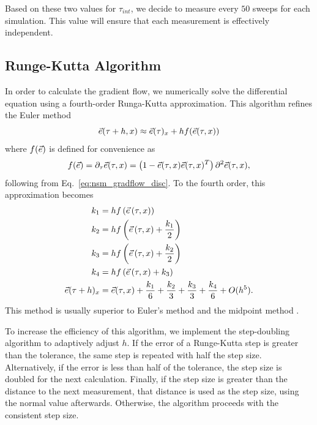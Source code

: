 Based on these two values for $\tau_{int}$, we decide to measure every $50$ sweeps for each simulation. This value will ensure that each measurement is effectively independent.

\subsection{Runge-Kutta Algorithm}
\label{sec:runga-kutta}
In order to calculate the gradient flow, we numerically solve the differential equation using a fourth-order Runga-Kutta approximation. This algorithm refines the Euler method 
\begin{equation*}
    \vec e(\tau+h,x) \approx \vec e(\tau)_x + h f(\vec e(\tau,x))
\end{equation*}
where $f(\vec e)$ is defined for convenience as 
\begin{equation}
    f(\vec e)=\partial_\tau \vec e (\tau,x)  = \left( 1 - \vec e(\tau,x) \vec e(\tau,x)^T\right) \partial^2 \vec e(\tau,x),
\end{equation}
following from Eq.~\ref{eq:nsm_gradflow_disc}. To the fourth order, this approximation becomes 
%
\begin{align}
    \label{eq:rungekutta}
    k_1 &= h f\left(\vec e\left(\tau,x\right)\right) \\ 
    k_2 &= h f\left(\vec e\left(\tau,x\right) + \frac{k_1}{2}\right) \\ 
    k_3 &= h f\left(\vec e\left(\tau,x\right) + \frac{k_2}{2}\right) \\ 
    k_4 &= h f\left(\vec e\left(\tau,x\right) + k_3\right) \\ 
    \vec e(\tau+h)_x &= \vec e(\tau,x) + \frac{k_1}{6} + \frac{k_2}{3} + \frac{k_3}{3} + \frac{k_4}{6} + O(h^5).
\end{align}
This method is usually superior to Euler's method and the midpoint method \cite{vetterling1992}.

To increase the efficiency of this algorithm, we implement the step-doubling algorithm to adaptively adjust $h$. If the error of a Runge-Kutta step is greater than the tolerance, the same step is repeated with half the step size. Alternatively, if the error is less than half of the tolerance, the step size is doubled for the next calculation. Finally, if the step size is greater than the distance to the next measurement, that distance is used as the step size, using the normal value afterwards. Otherwise, the algorithm proceeds with the consistent step size. 


